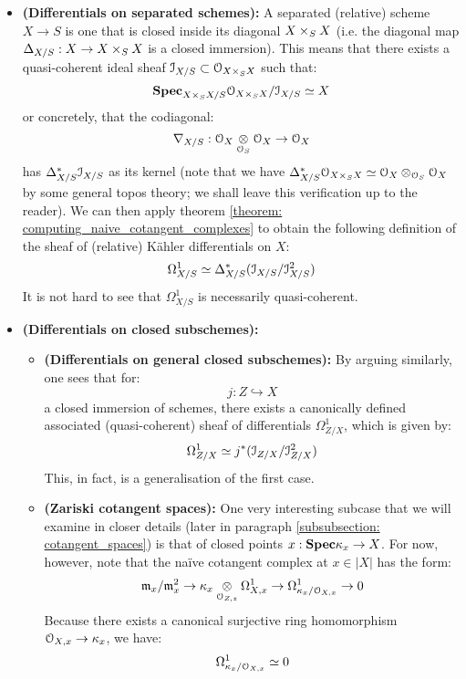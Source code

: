                 \begin{corollary} \label{coro: naive_cotangent_complex_of_separated_schemes_and_closed_subschemes}
                    \noindent
                    \begin{itemize}
                        \item \textbf{(Differentials on separated schemes):} A separated (relative) scheme $X \to S$ is one that is closed inside its diagonal $X \x_S X$ (i.e. the diagonal map $\Delta_{X/S}: X \to X \x_S X$ is a closed immersion). This means that there exists a quasi-coherent ideal sheaf $\calI_{X/S} \subset \calO_{X \x_S X}$ such that:
                        $$\Spec_{X \x_S X/S} \calO_{X \x_S X}/\calI_{X/S} \cong X$$
                        or concretely, that the codiagonal:
                            $$\nabla_{X/S}: \calO_X \tensor_{\calO_S} \calO_X \to \calO_X$$
                        has $\Delta^*_{X/S} \mathcal{I}_{X/S}$ as its kernel (note that we have $\Delta^*_{X/S} \calO_{X \x_S X} \cong \calO_X \tensor_{\calO_S} \calO_X$ by some general topos theory; we shall leave this verification up to the reader). We can then apply theorem \ref{theorem: computing_naive_cotangent_complexes} to obtain the following definition of the sheaf of (relative) K\"ahler differentials on $X$:
                            $$\Omega^1_{X/S} \simeq \Delta^*_{X/S}(\mathcal{I}_{X/S}/\mathcal{I}_{X/S}^2)$$
                        It is not hard to see that $\Omega^1_{X/S}$ is necessarily quasi-coherent.
                        \item \textbf{(Differentials on closed subschemes):}
                            \begin{itemize}
                                \item \textbf{(Differentials on general closed subschemes):} By arguing similarly, one sees that for:
                                    $$j: Z \hookrightarrow X$$
                                a closed immersion of schemes, there exists a canonically defined associated (quasi-coherent) sheaf of differentials $\Omega^1_{Z/X}$, which is given by:
                                    $$\Omega^1_{Z/X} \simeq j^*(\mathcal{I}_{Z/X}/\mathcal{I}_{Z/X}^2)$$
                                This, in fact, is a generalisation of the first case.
                                \item \textbf{(Zariski cotangent spaces):} One very interesting subcase that we will examine in closer details (later in paragraph \ref{subsubsection: cotangent_spaces}) is that of closed points $x: \mathbf{Spec} \kappa_x \to X$. For now, however, note that the na\"ive cotangent complex at $x \in |X|$ has the form:
                                    $$\m_x/\m_x^2 \to \kappa_x \tensor_{\calO_{Z, z}} \Omega^1_{X, x} \to \Omega^1_{\kappa_x/\calO_{X, x}} \to 0$$
                                Because there exists a canonical surjective ring homomorphism $\mathcal{O}_{X, x} \to \kappa_x$, we have:
                                    $$\Omega^1_{\kappa_x/\mathcal{O}_{X, x}} \simeq 0$$
                            \end{itemize}
                    \end{itemize}
                \end{corollary}
    
